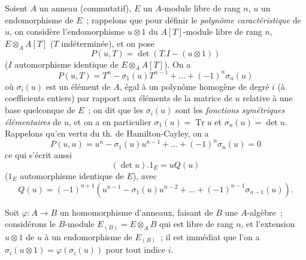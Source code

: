 \begin{env}[6.4.1]
\label{II.6.4.1-fr}
Soient $A$ un anneau (commutatif), $E$ un $A$-module libre de rang $n$, $u$
un endomorphisme de $E$~; rappelons que pour définir le \emph{polynôme
caractéristique} de $u$, on considère l'endomorphisme $u\otimes1$ du
$A[T]$-module libre de rang $n$, $E\otimes_AA[T]$ ($T$ indéterminée), et on
pose
\[
\label{II.6.4.1.1-fr}
P(u,T)=\det(T.I-(u\otimes1))
\tag{6.4.1.1}
\]
($I$ automorphisme identique de $E\otimes_AA[T]$). On a
\[
\label{II.6.4.1.2-fr}
P(u,T)=T^n-\sigma_1(u)T^{n-1}+\ldots+(-1)^n\sigma_n(u)
\tag{6.4.1.2}
\]
où $\sigma_i(u)$ est un élément de $A$, égal à un polynôme homogène de degré
$i$ (à coefficients entiers) par rapport aux éléments de la matrice de $u$
relative à une base quelconque de $E$~; on dit que les $\sigma_i(u)$ sont les
\emph{fonctions symétriques élémentaires} de $u$, et on a en particulier
$\sigma_1(u)=\operatorname{Tr}u$ et $\sigma_n(u)=\det u$. Rappelons qu'en
vertu du th. de Hamilton-Cayley, on a
\[
\label{II.6.4.1.3-fr}
P(u,u)=u^n-\sigma_1(u)u^{n-1}+\ldots+(-1)^n\sigma_n(u)=0
\tag{6.4.1.3}
\]
ce qui s'écrit aussi
\[
\label{II.6.4.1.4-fr}
(\det u). 1_E=uQ(u)
\tag{6.4.1.4}
\]
($1_E$ automorphisme identique de $E$), avec
\[
\label{II.6.4.1.5-fr}
Q(u)=(-1)^{n+1}(u^{n-1}-\sigma_1(u)u^{n-2}+\ldots+(-1)^{n-1}\sigma_{n-1}(u)).
\tag{6.4.1.5}
\]

Soit $\varphi:A\to B$ un homomorphisme d'anneaux, faisant de $B$ une
$A$-algèbre~; considérons le $B$-module
$E_{(B)}=E\otimes_AB$ qui est libre de rang $n$, et l'extension $u\otimes1$
de $u$ à un endomorphisme de $E_{(B)}$~; il est immédiat que l'on a
$\sigma_i(u\otimes1)=\varphi(\sigma_i(u))$ pour tout indice $i$.
\end{env}

